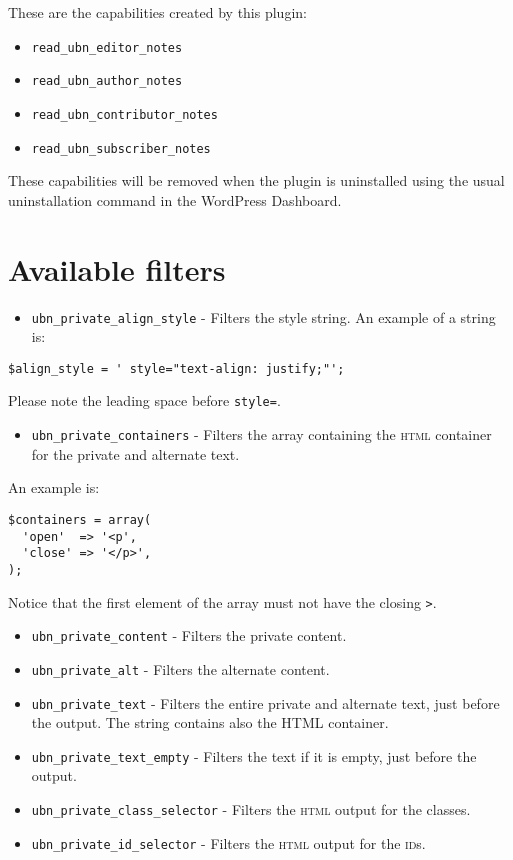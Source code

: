 \documentclass[a4paper,11pt]{article}
\begin{document}
These are the capabilities created by this plugin:

\begin{itemize}
 \item \verb+read_ubn_editor_notes+
 \item \verb+read_ubn_author_notes+
 \item \verb+read_ubn_contributor_notes+
 \item \verb+read_ubn_subscriber_notes+
\end{itemize}

These capabilities will be removed when the plugin is uninstalled using the usual uninstallation command in the WordPress Dashboard.

\section{Available filters}

\begin{itemize}
 \item \verb+ubn_private_align_style+ - Filters the style string. An example of a string is:
\end{itemize}

\begin{lstlisting}
$align_style = ' style="text-align: justify;"';
\end{lstlisting}

Please note the leading space before \verb+style=+.

\begin{itemize}
 \item \verb+ubn_private_containers+ - Filters the array containing the \textsc{html} container for the private and alternate text.
\end{itemize}

An example is:

\begin{lstlisting}
$containers = array(
  'open'  => '<p',
  'close' => '</p>',
);
\end{lstlisting}

Notice that the first element of the array must not have the closing \verb+>+.

\begin{itemize}
 \item \verb+ubn_private_content+ - Filters the private content.
 \item \verb+ubn_private_alt+ - Filters the alternate content.
 \item \verb+ubn_private_text+ - Filters the entire private and alternate text, just before the output. The string contains also the HTML container.
 \item \verb+ubn_private_text_empty+ - Filters the text if it is empty, just before the output.
 \item \verb+ubn_private_class_selector+ - Filters the \textsc{html} output for the classes.
 \item \verb+ubn_private_id_selector+ - Filters the \textsc{html} output for the \textsc{id}s.
\end{itemize}
\end{document}

